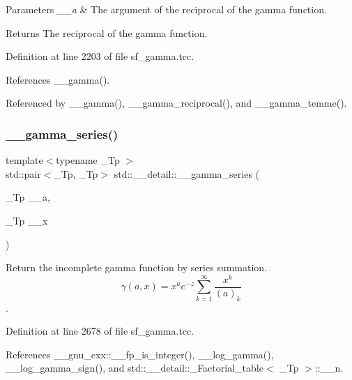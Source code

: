 \begin{DoxyParams}{Parameters}
{\em \+\_\+\+\_\+a} & The argument of the reciprocal of the gamma function. \\
\hline
\end{DoxyParams}
\begin{DoxyReturn}{Returns}
The reciprocal of the gamma function. 
\end{DoxyReturn}


Definition at line 2203 of file sf\+\_\+gamma.\+tcc.



References \+\_\+\+\_\+gamma().



Referenced by \+\_\+\+\_\+gamma(), \+\_\+\+\_\+gamma\+\_\+reciprocal(), and \+\_\+\+\_\+gamma\+\_\+temme().

\mbox{\label{namespacestd_1_1____detail_aa480c595e1c5b894d76398cf0e8eb02b}} 
\subsubsection{\texorpdfstring{\+\_\+\+\_\+gamma\+\_\+series()}{\_\_gamma\_series()}}
{\footnotesize\ttfamily template$<$typename \+\_\+\+Tp $>$ \\
std\+::pair$<$\+\_\+\+Tp, \+\_\+\+Tp$>$ std\+::\+\_\+\+\_\+detail\+::\+\_\+\+\_\+gamma\+\_\+series (\begin{DoxyParamCaption}\item[{\+\_\+\+Tp}]{\+\_\+\+\_\+a,  }\item[{\+\_\+\+Tp}]{\+\_\+\+\_\+x }\end{DoxyParamCaption})}



Return the incomplete gamma function by series summation. \[ \gamma(a,x) = x^a e^{-z}\sum_{k=1}^{\infty} \frac{x^k}{(a)_k} \]. 



Definition at line 2678 of file sf\+\_\+gamma.\+tcc.



References \+\_\+\+\_\+gnu\+\_\+cxx\+::\+\_\+\+\_\+fp\+\_\+is\+\_\+integer(), \+\_\+\+\_\+log\+\_\+gamma(), \+\_\+\+\_\+log\+\_\+gamma\+\_\+sign(), and std\+::\+\_\+\+\_\+detail\+::\+\_\+\+Factorial\+\_\+table$<$ \+\_\+\+Tp $>$\+::\+\_\+\+\_\+n.



